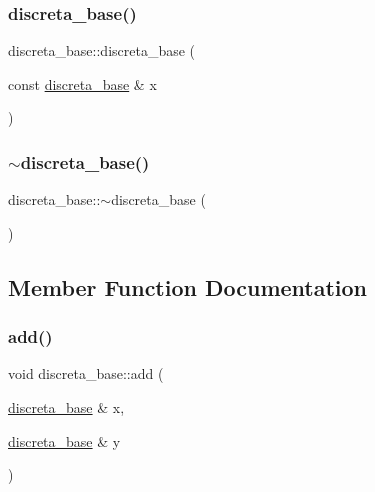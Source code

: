 \mbox{\label{classdiscreta__base_a0cdb2756e70a71eccecd13727f4e8f99}} 
\subsubsection{\texorpdfstring{discreta\+\_\+base()}{discreta\_base()}\hspace{0.1cm}{\footnotesize\ttfamily [2/2]}}
{\footnotesize\ttfamily discreta\+\_\+base\+::discreta\+\_\+base (\begin{DoxyParamCaption}\item[{const \mbox{\hyperlink{classdiscreta__base}{discreta\+\_\+base}} \&}]{x }\end{DoxyParamCaption})}

\mbox{\label{classdiscreta__base_a14df6915d3622e941d8bd541a6818d0e}} 
\subsubsection{\texorpdfstring{$\sim$discreta\+\_\+base()}{~discreta\_base()}}
{\footnotesize\ttfamily discreta\+\_\+base\+::$\sim$discreta\+\_\+base (\begin{DoxyParamCaption}{ }\end{DoxyParamCaption})\hspace{0.3cm}{\ttfamily [virtual]}}



\subsection{Member Function Documentation}
\mbox{\label{classdiscreta__base_a209e98b4fef96cb922b3caa49cd70a79}} 
\subsubsection{\texorpdfstring{add()}{add()}}
{\footnotesize\ttfamily void discreta\+\_\+base\+::add (\begin{DoxyParamCaption}\item[{\mbox{\hyperlink{classdiscreta__base}{discreta\+\_\+base}} \&}]{x,  }\item[{\mbox{\hyperlink{classdiscreta__base}{discreta\+\_\+base}} \&}]{y }\end{DoxyParamCaption})}

